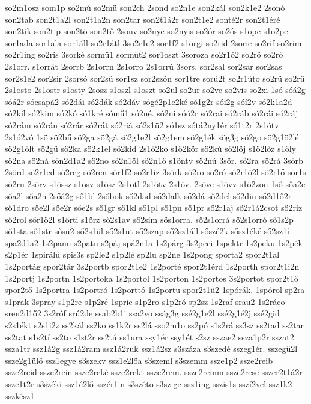 {so2m1osz
som1p
so2mú
so2mü
son2ch
2sond
so2n1e
son2kál
son2k1e2
2sonó
son2tab
son2t1a2l
son2t1a2n
son2tar
son2t1á2r
son2t1e2
sonté2r
son2t1éré
son2tik
son2tip
son2tö
son2tő
2sonv
so2nye
so2nyis
so2ór
so2ós
s1opc
s1o2pe
sor1ada
sor1ala
sor1áll
so2r1átl
3so2r1e2
sor1f2
s1orgi
so2rid
2sorie
so2rif
so2rim
so2r1ing
so2ris
3sorké
sormű1
sorműt2
sor1oszt
3soroza
so2r1ó2
so2rö
so2rő
2s1orr.
s1orrát
2sorrb
2s1orrn
2s1orro
2s1orrú
3sors.
sor2sal
sor2sar
sor2sas
sor2s1e2
sor2sir
2sorsó
sor2sü
sor1sz
sor2szón
sor1tre
sorú2t
so2r1úto
so2rü
so2rű
2s1osto
2s1ostr
s1osty
2sosz
s1oszl
s1oszt
so2ul
so2ur
so2ve
so2vis
so2xi
1só
sóá2g
sóá2r
sócsapá2
só2dái
só2dák
só2dáv
sógé2p1e2ké
só1g2r
sói2g
sóí2v
só2k1a2d
só2kil
só2kim
só2kó
só1kré
sómű1
só2né.
só2ni
sóó2r
só2rai
só2ráb
só2rái
só2ráj
só2rám
só2rán
só2rár
só2rát
só2riá
só2s1ü2
só1sz
sótá2ny1ér
só1t2r
2s1ótv
2s1ó2vó
1sö
sö2bű
sö2ga
sö2gá
sö2g1e2l
sö2g1em
sö2g1ék
sög3g
sö2go
sö2g1ö2lé
sö2g1ölt
sö2gű
sö2ka
sö2k1el
sö2kid
2s1ö2ko
s1ö2kör
sö2kú
sö2lőj
s1ö2lőz
s1öly
sö2na
sö2ná
sön2d1a2
sö2no
sö2n1öl
sö2n1ő
s1öntv
sö2nú
3sör.
sö2ra
sö2rá
3sörb
2sörd
sö2r1ed
sö2reg
sö2ren
sör1f2
sö2r1iz
3sörk
sö2ro
sö2ró
sö2r1ö2l
sö2r1ő
sör1s
sö2ru
2sörv
s1össz
s1ösv
s1ösz
2s1ötl
2s1ötv
2s1öv.
2söve
s1övv
s1ö2zön
1ső
sőa2c
sőa2l
sőa2n
2sőá2g
ső1bl
2sőbok
ső2dad
ső2dalk
ső2dá
ső2del
ső2din
ső2d1ő2r
ső1dro
sőe2l
sőe2r
sőe2s
ső1gr
ső1kl
ső1pl
ső1pn
ső1pr
ső2r1aj
ső2r1á2csot
ső2riz
ső2rol
sőr1ö2l
s1őrti
s1őrz
ső2s1av
ső2sim
sős1orra.
ső2s1orrá
ső2s1orró
ső1s2p
ső1sta
ső1str
sősü2
ső2s1ül
ső2s1üt
ső2szap
ső2sz1áll
sőszé2k
sősz1éké
ső2sz1í
spa2d1a2
1s2pann
s2patu
s2páj
spá2n1a
1s2párg
3s2peci
1spektr
1s2peku
1s2pék
s2p1ér
1spirálú
spis3s
sp2le2
s1p2lé
sp2lu
sp2ne
1s2pong
sporta2
spor2t1al
1s2portág
spor2tár
3s2portb
spor2t1e2
1s2porté
spor2t1érd
1s2porth
spor2t1i2n
1s2portj
1s2portn
1s2portoka
1s2portol
1s2porton
1s2portos
3s2portot
spor2t1ö
spor2tő
1s2portra
1s2portró
1s2porttó
1s2portu
spor2t1ü2
1spórák.
1spórol
sp2ra
s1prak
3spray
s1p2re
s1p2ré
1spric
s1p2ro
s1p2ró
sp2sz
1s2raf
srau2
1s2ráco
sren2d1ő2
3s2róf
srú2de
ssab2b1i
ssa2vo
sság3g
ssé2g1e2l
ssé2g1é2j
ssé2gid
s2s1ékt
s2s1i2z
ss2kál
ss2ko
ss1k2r
ss2lá
sso2m1o
ss2pó
s1s2rá
ss3sz
ss2tad
ss2tar
ss2tat
s1s2tí
ss2to
s1st2r
ss2tú
ss1ura
ssy1ér
ssy1ét
s2sz
sszae2
ssza1p2r
sszat2
ssza1tr
ssz1á2g
ssz1á2ram
ssz1á2ruk
ssz1á2sz
s3száza
s3szedé
sszeg1ér.
sszegü2l
ssze2g1ülő
ssz1egye
s3szekv
ssz1e2lőa
s3szeml
s3szemm
ssze1p2
ssze2reib
ssze2reid
ssze2rein
ssze2reké
ssze2rekt
ssze2rem.
ssze2remm
ssze2rese
sszer2t1á2r
ssze1t2r
s3széki
ssz1é2lő
sszér1in
s3széto
s3szige
ssz1ing
sszis1s
sszí2vel
ssz1k2
sszkész1
}
